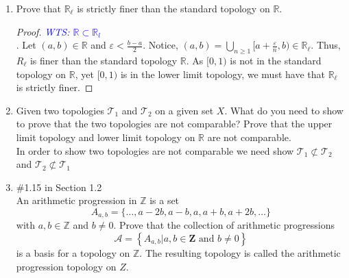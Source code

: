 \documentclass[12pt]{article}
\newcommand{\R}{\mathbb{R}}
\newcommand{\TT}{\mathcal{T}}
\newcommand{\wts}[1]{\textit{\textcolor{blue}{WTS: #1}}\\}
\begin{document}
\begin{enumerate}
\item Prove that $\R_\ell$ is strictly finer than the standard topology on $\R$.
\begin{proof}
	\wts{$ \R\subset \R_l $}.
	Let $ (a,b)\in\R $ and $ \varepsilon < \frac{b-a}{2} $. Notice, $ (a,b) =\bigcup_{n\geq 1} [a+\frac{\varepsilon}{n},b)\in\R_\ell $. Thus, $ R_\ell $ is finer than the standard topology $ \R $. As $ [0,1)$ is not in the standard topology on $ \R $, yet $ [0,1) $ is in the lower limit topology, we must have that $ \R_\ell $ is strictly finer.
\end{proof}
\item Given two topologies $\TT_1$ and $\TT_2$ on a given set $X$. What do you need to show to prove that the two topologies are not comparable? Prove that the upper limit topology and lower limit topology on $\R$ are not comparable. \\
In order to show two topologies are not comparable we need show $ \TT_1 \not\subset \TT_2 $ and $ \TT_2 \not\subset \TT_1 $

\item \#1.15 in Section 1.2\\
An arithmetic progression in $\mathbb{Z}$ is a set
$$
A_{a, b}=\{\ldots, a-2 b, a-b, a, a+b, a+2 b, \ldots\}
$$
with $a, b \in \mathbb{Z}$ and $b \neq 0 .$ Prove that the collection of arithmetic progressions
$$
\mathcal{A}=\left\{A_{a, b} | a, b \in \mathbf{Z} \text { and } b \neq 0\right\}
$$
is a basis for a topology on $\mathbb{Z}$. The resulting topology is called the arithmetic progression topology on $Z .$


\end{enumerate}
\end{document}
